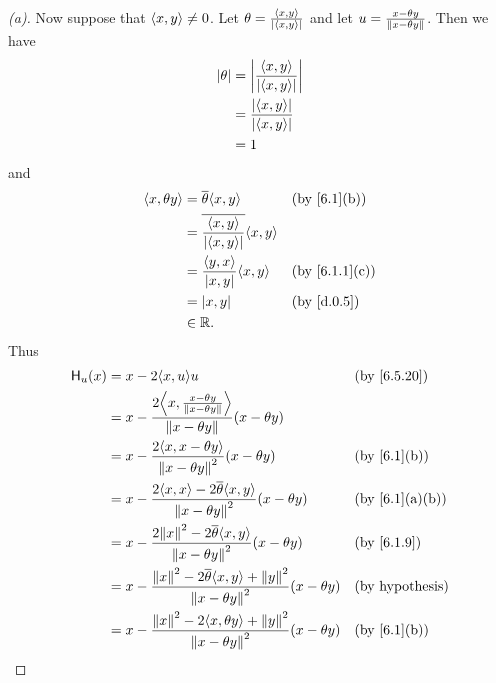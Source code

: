 \begin{proof}[(a)]
  Now suppose that \(\left\langle x, y\right\rangle \neq 0\).
  Let \(\theta = \frac{\left\langle x, y\right\rangle}{\left\lvert\left\langle x, y\right\rangle\right\rvert}\) and let \(u = \frac{x - \theta y}{\left\lVert x - \theta y\right\rVert}\).
  Then we have
  \begin{align*}
    \left\lvert\theta\right\rvert & = \left\lvert\frac{\left\langle x, y\right\rangle}{\left\lvert\left\langle x, y\right\rangle\right\rvert}\right\rvert \\
                 & = \frac{\left\lvert\left\langle x, y\right\rangle\right\rvert}{\left\lvert\left\langle x, y\right\rangle\right\rvert} \\
                 & = 1
  \end{align*}
  and
  \begin{align*}
    \inn{x, \theta y} & = \conj{\theta} \inn{x, y}                              &  & \by{6.1}[b]   \\
                      & = \conj{\frac{\inn{x, y}}{\abs{\inn{x, y}}}} \inn{x, y}                    \\
                      & = \frac{\inn{y, x}}{\abs{x, y}} \inn{x, y}              &  & \by{6.1.1}[c] \\
                      & = \abs{x, y}                                            &  & \by{d.0.5}    \\
                      & \in \R.
  \end{align*}
  Thus
  \begin{align*}
    \lt{H}_u(x) & = x - 2 \inn{x, u} u                                                                                               &  & \by{6.5.20}                \\
                & = x - \frac{2 \inn{x, \frac{x - \theta y}{\norm{x - \theta y}}}}{\norm{x - \theta y}} (x - \theta y)                                               \\
                & = x - \frac{2 \inn{x, x - \theta y}}{\norm{x - \theta y}^2} (x - \theta y)                                         &  & \by{6.1}[b]                \\
                & = x - \frac{2 \inn{x, x} - 2 \conj{\theta} \inn{x, y}}{\norm{x - \theta y}^2} (x - \theta y)                       &  & \by{6.1}[a,b]              \\
                & = x - \frac{2 \norm{x}^2 - 2 \conj{\theta} \inn{x, y}}{\norm{x - \theta y}^2} (x - \theta y)                       &  & \by{6.1.9}                 \\
                & = x - \frac{\norm{x}^2 - 2 \conj{\theta} \inn{x, y} + \norm{y}^2}{\norm{x - \theta y}^2} (x - \theta y)            &  & \text{(by hypothesis)}     \\
                & = x - \frac{\norm{x}^2 - 2 \inn{x, \theta y} + \norm{y}^2}{\norm{x - \theta y}^2} (x - \theta y)                   &  & \by{6.1}[b]                \\

\end{align*}
\end{proof}
